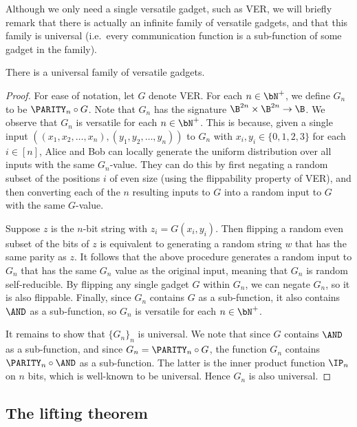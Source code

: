 Although we only need a single versatile gadget,
such as \textsc{VER}, we will briefly remark that there is
actually an infinite family of versatile gadgets, and that
this family is universal (i.e.\ every communication function
is a sub-function of some gadget in the family).

\begin{lemma}
There is a universal family of versatile gadgets.
\end{lemma}

\begin{proof}
For ease of notation, let $G$ denote \textsc{VER}.
For each $n\in\bN^+$, we define $G_{n}$ to be
$\PARITY_n\circ G$. Note that $G_{n}$ has the signature
$\B^{2n}\times\B^{2n}\to\B$. We observe that $G_{n}$
is versatile for each $n\in\bN^{+}$. This is because,
given a single input $((x_1,x_2,\dots,x_n),(y_1,y_2,\dots,y_n))$
to $G_{n}$ with $x_i,y_i\in\{0,1,2,3\}$ for each $i\in[n]$,
Alice and Bob can locally generate the uniform
distribution over all inputs with the same $G_{n}$-value.
They can do this by first negating a random subset of the
positions $i$ of even size
(using the flippability property of \textsc{VER}),
and then converting each of the $n$ resulting inputs to $G$
into a random input to $G$ with the same $G$-value.

Suppose $z$ is the $n$-bit string with $z_i=G(x_i,y_i)$.
Then flipping a random even subset of the bits of $z$
is equivalent to generating a random string $w$ that has
the same parity as $z$. It follows that the above procedure
generates a random input to $G_{n}$ that has the same $G_{n}$
value as the original input, meaning that $G_{n}$
is random self-reducible. By flipping any single gadget
$G$ within $G_{n}$, we can negate $G_n$, so it is also
flippable. Finally, since $G_n$ contains $G$ as a sub-function,
it also contains $\AND$ as a sub-function, so $G_n$
is versatile for each $n\in\bN^{+}$.

It remains to show that $\{G_n\}_n$ is universal.
We note that since $G$ contains $\AND$ as a sub-function,
and since $G_n=\PARITY_n\circ G$, the function $G_n$
contains $\PARITY_n\circ\AND$ as a sub-function. The latter
is the inner product function $\IP_n$ on $n$ bits,
which is well-known to be universal. Hence $G_n$ is also
universal.
\end{proof}


\subsection{The lifting theorem}

